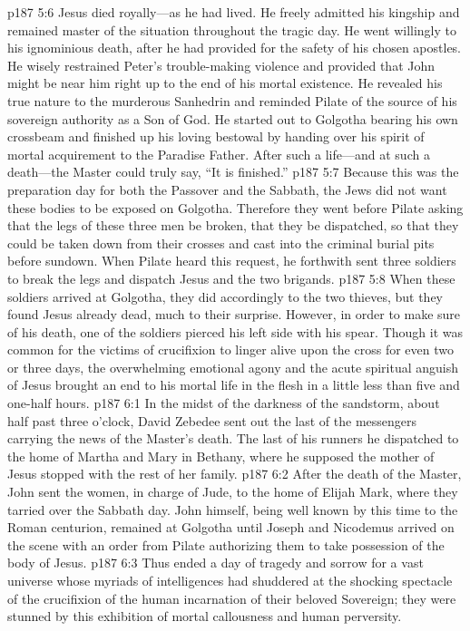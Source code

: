 \pc \vs p187 5:6 Jesus died royally---as he had lived. He freely admitted his kingship and remained master of the situation throughout the tragic day. He went willingly to his ignominious death, after he had provided for the safety of his chosen apostles. He wisely restrained Peter’s trouble\hyp{}making violence and provided that John might be near him right up to the end of his mortal existence. He revealed his true nature to the murderous Sanhedrin and reminded Pilate of the source of his sovereign authority as a Son of God. He started out to Golgotha bearing his own crossbeam and finished up his loving bestowal by handing over his spirit of mortal acquirement to the Paradise Father. After such a life---and at such a death---the Master could truly say, \textcolor{ubdarkred}{“It is finished.”}
\pc \vs p187 5:7 Because this was the preparation day for both the Passover and the Sabbath, the Jews did not want these bodies to be exposed on Golgotha. Therefore they went before Pilate asking that the legs of these three men be broken, that they be dispatched, so that they could be taken down from their crosses and cast into the criminal burial pits before sundown. When Pilate heard this request, he forthwith sent three soldiers to break the legs and dispatch Jesus and the two brigands.
\vs p187 5:8 When these soldiers arrived at Golgotha, they did accordingly to the two thieves, but they found Jesus already dead, much to their surprise. However, in order to make sure of his death, one of the soldiers pierced his left side with his spear. Though it was common for the victims of crucifixion to linger alive upon the cross for even two or three days, the overwhelming emotional agony and the acute spiritual anguish of Jesus brought an end to his mortal life in the flesh in a little less than five and one\hyp{}half hours.
\vs p187 6:1 In the midst of the darkness of the sandstorm, about half past three o’clock, David Zebedee sent out the last of the messengers carrying the news of the Master’s death. The last of his runners he dispatched to the home of Martha and Mary in Bethany, where he supposed the mother of Jesus stopped with the rest of her family.
\vs p187 6:2 After the death of the Master, John sent the women, in charge of Jude, to the home of Elijah Mark, where they tarried over the Sabbath day. John himself, being well known by this time to the Roman centurion, remained at Golgotha until Joseph and Nicodemus arrived on the scene with an order from Pilate authorizing them to take possession of the body of Jesus.
\vs p187 6:3 Thus ended a day of tragedy and sorrow for a vast universe whose myriads of intelligences had shuddered at the shocking spectacle of the crucifixion of the human incarnation of their beloved Sovereign; they were stunned by this exhibition of mortal callousness and human perversity.
